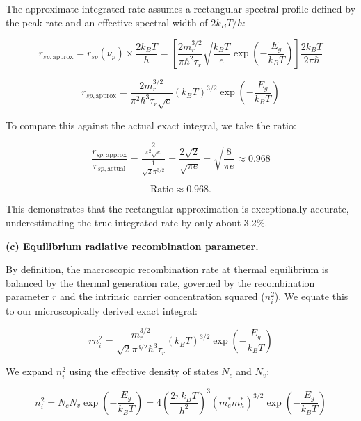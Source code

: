 The approximate integrated rate assumes a rectangular spectral profile defined by the peak rate and an effective spectral width of $2k_B T/h$:

\begin{equation*}
  r_{sp,\text{approx}} = r_{sp}(\nu_p) \times \frac{2 k_B T}{h} = \left[ \frac{2 m_r^{3/2}}{\pi \hbar^2 \tau_r} \sqrt{\frac{k_B T}{e}} \exp\left(-\frac{E_g}{k_B T}\right) \right] \frac{2 k_B T}{2\pi\hbar}
\end{equation*}

\begin{equation*}
  r_{sp,\text{approx}} = \frac{2 m_r^{3/2}}{\pi^2 \hbar^3 \tau_r \sqrt{e}} (k_B T)^{3/2} \exp\left(-\frac{E_g}{k_B T}\right)
\end{equation*}

To compare this against the actual exact integral, we take the ratio:

\begin{equation*}
  \frac{r_{sp,\text{approx}}}{r_{sp,\text{actual}}} = \frac{\frac{2}{\pi^2 \sqrt{e}}}{\frac{1}{\sqrt{2} \pi^{3/2}}} = \frac{2\sqrt{2}}{\sqrt{\pi e}} = \sqrt{\frac{8}{\pi e}} \approx 0.968
\end{equation*}

\begin{equation*}
  \boxed{\text{Ratio} \approx 0.968.}
\end{equation*}

This demonstrates that the rectangular approximation is exceptionally accurate, underestimating the true integrated rate by only about 3.2\%.

\textbf{(c) Equilibrium radiative recombination parameter.}

By definition, the macroscopic recombination rate at thermal equilibrium is balanced by the thermal generation rate, governed by the recombination parameter $r$ and the intrinsic carrier concentration squared ($n_i^2$). We equate this to our microscopically derived exact integral:

\begin{equation*}
  r n_i^2 = \frac{m_r^{3/2}}{\sqrt{2} \pi^{3/2} \hbar^3 \tau_r} (k_B T)^{3/2} \exp\left(-\frac{E_g}{k_B T}\right)
\end{equation*}

We expand $n_i^2$ using the effective density of states $N_c$ and $N_v$:

\begin{equation*}
  n_i^2 = N_c N_v \exp\left(-\frac{E_g}{k_B T}\right) = 4 \left( \frac{2\pi k_B T}{h^2} \right)^3 (m_e^* m_h^*)^{3/2} \exp\left(-\frac{E_g}{k_B T}\right)
\end{equation*}

